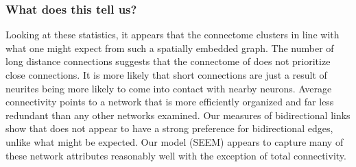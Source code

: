 \subsubsection{What does this tell us?} Looking at these statistics, it appears that the \ce connectome clusters in line with what one might expect from such a spatially embedded graph. The number of long distance connections suggests that the connectome of \ce does not prioritize close connections. It is more likely that short connections are just a result of neurites being more likely to come into contact with nearby neurons. Average connectivity points to a network that is more efficiently organized and far less redundant than any other networks examined. Our measures of bidirectional links show that \ce does not appear to have a strong preference for bidirectional edges, unlike what might be expected. Our model (SEEM) appears to capture many of these network attributes reasonably well with the exception of total connectivity.